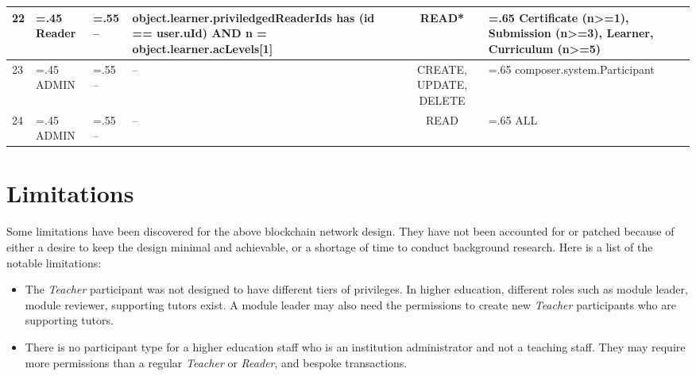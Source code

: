 \begin{landscape}
\begin{table}
\begin{tabularx}{24cm}{l>{\hsize=.45\hsize}X>{\hsize=.55\hsize}X>{\hsize=0.9\hsize}Xc>{\hsize=.65\hsize}X}
			\midrule
			22 & Reader  & --                                            & object.learner.priviledgedReaderIds has (id == user.uId) AND n = object.learner.acLevels[1] & READ*                  & Certificate (n>=1), \newline Submission (n>=3), \newline Learner, Curriculum (n>=5) \\
			\midrule
			23 & ADMIN   & --                                            & --                                                                                          & CREATE, UPDATE, DELETE & composer.system.Participant                                                                        \\
			\midrule
			24 & ADMIN   & --                                            & --                                                                                          & READ                   & ALL                                                                                 \\
			\bottomrule
		\end{tabularx}
	\end{table}
\end{landscape}

\section{Limitations}

Some limitations have been discovered for the above blockchain network design. They have not been accounted for or patched
because of either a desire to keep the design minimal and achievable, or a shortage of time to conduct background research.
Here is a list of the notable limitations:

\begin{itemize}
	\item The \textit{Teacher} participant was not designed to have different tiers of privileges. In higher education,
	      different roles such as module leader, module reviewer, supporting tutors exist. A module leader may also need the
	      permissions to create new \textit{Teacher} participants who are supporting tutors.
	\item There is no participant type for a higher education staff who is an institution administrator and not a teaching staff.
	      They may require more permissions than a regular \textit{Teacher} or \textit{Reader}, and bespoke transactions.
\end{itemize}

